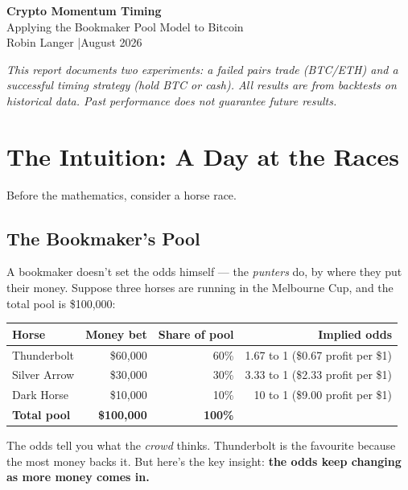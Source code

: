 \documentclass[11pt,a4paper]{article}
\begin{document}
\begin{center}
{\LARGE\bfseries\color{accent} Crypto Momentum Timing}\\[0.5em]
{\large Applying the Bookmaker Pool Model to Bitcoin}\\[1em]
{\small Robin Langer \quad|\quad August 2026}
\end{center}

\vspace{1em}

\textit{This report documents two experiments: a failed pairs trade
(BTC/ETH) and a successful timing strategy (hold BTC or cash). All
results are from backtests on historical data. Past performance does
not guarantee future results.}


\section{The Intuition: A Day at the Races}

Before the mathematics, consider a horse race.

\subsection{The Bookmaker's Pool}

A bookmaker doesn't set the odds himself --- the \emph{punters} do,
by where they put their money. Suppose three horses are running in
the Melbourne Cup, and the total pool is \$100,000:

\vspace{0.5em}
\begin{tabular}{@{}lrrr@{}}
    \toprule
    \textbf{Horse} & \textbf{Money bet} & \textbf{Share of pool}
        & \textbf{Implied odds} \\
    \midrule
    Thunderbolt  & \$60,000 & 60\% & 1.67 to 1 (\$0.67 profit per \$1) \\
    Silver Arrow & \$30,000 & 30\% & 3.33 to 1 (\$2.33 profit per \$1) \\
    Dark Horse   & \$10,000 & 10\% & 10 to 1 (\$9.00 profit per \$1) \\
    \midrule
    \textbf{Total pool} & \textbf{\$100,000} & \textbf{100\%} & \\
    \bottomrule
\end{tabular}

\vspace{0.5em}
The odds tell you what the \emph{crowd} thinks. Thunderbolt is the
favourite because the most money backs it. But here's the key insight:
\textbf{the odds keep changing as more money comes in.}
\end{document}

